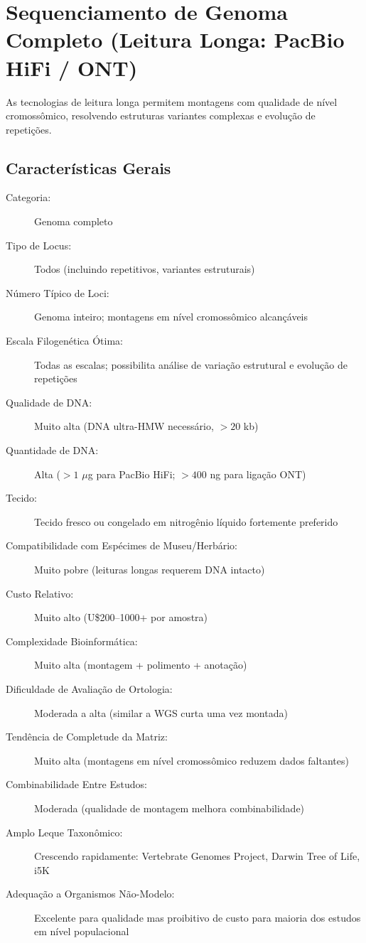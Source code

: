 \textcite{delsuc2005, jarvis2014, lewin2018, lozano-fernandez2022}

\section{Sequenciamento de Genoma Completo (Leitura Longa: PacBio HiFi / ONT)}

As tecnologias de leitura longa permitem montagens com qualidade de nível cromossômico, resolvendo estruturas variantes complexas e evolução de repetições.

\subsection{Características Gerais}

\begin{description}
\item[Categoria:] Genoma completo
\item[Tipo de Locus:] Todos (incluindo repetitivos, variantes estruturais)
\item[Número Típico de Loci:] Genoma inteiro; montagens em nível cromossômico alcançáveis
\item[Escala Filogenética Ótima:] Todas as escalas; possibilita análise de variação estrutural e evolução de repetições
\item[Qualidade de DNA:] Muito alta (DNA ultra-HMW necessário, \(>20\) kb)
\item[Quantidade de DNA:] Alta (\(>1\) $\mu$g para PacBio HiFi; \(>400\) ng para ligação ONT)
\item[Tecido:] Tecido fresco ou congelado em nitrogênio líquido fortemente preferido
\item[Compatibilidade com Espécimes de Museu/Herbário:] Muito pobre (leituras longas requerem DNA intacto)
\item[Custo Relativo:] Muito alto (U\$200--1000+ por amostra)
\item[Complexidade Bioinformática:] Muito alta (montagem + polimento + anotação)
\item[Dificuldade de Avaliação de Ortologia:] Moderada a alta (similar a WGS curta uma vez montada)
\item[Tendência de Completude da Matriz:] Muito alta (montagens em nível cromossômico reduzem dados faltantes)
\item[Combinabilidade Entre Estudos:] Moderada (qualidade de montagem melhora combinabilidade)
\item[Amplo Leque Taxonômico:] Crescendo rapidamente: Vertebrate Genomes Project, Darwin Tree of Life, i5K
\item[Adequação a Organismos Não-Modelo:] Excelente para qualidade mas proibitivo de custo para maioria dos estudos em nível populacional
\end{description}


